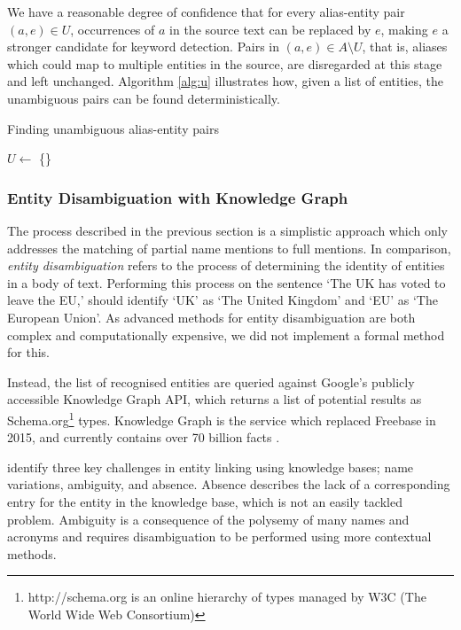 We have a reasonable degree of confidence that for every alias-entity pair $(a, e) \in U$, occurrences of $a$ in the source text can be replaced by $e$, making $e$ a stronger candidate for keyword detection. Pairs in $(a, e) \in A\setminus{U}$, that is, aliases which could map to multiple entities in the source, are disregarded at this stage and left unchanged. Algorithm \ref{alg:u} illustrates how, given a list of entities, the unambiguous pairs can be found deterministically.
\begin{algorithm}
\label{alg:u}
 \caption{Finding unambiguous alias-entity pairs}
 $U \gets$ \{\}\;
\end{algorithm}


\subsubsection{Entity Disambiguation with Knowledge Graph} \label{sec:gkg}

The process described in the previous section is a simplistic approach which only addresses the matching of partial name mentions to full mentions. In comparison, \textit{entity disambiguation} refers to the process of determining the identity of entities in a body of text. Performing this process on the sentence `The UK has voted to leave the EU,' should identify `UK' as `The United Kingdom' and `EU' as `The European Union'. As advanced methods for entity disambiguation are both complex and computationally expensive, we did not implement a formal method for this. 

Instead, the list of recognised entities are queried against Google's publicly accessible Knowledge Graph API, which returns a list of potential results as Schema.org\footnote{http://schema.org is an online hierarchy of types managed by W3C (The World Wide Web Consortium)} types. Knowledge Graph is the service which replaced Freebase in 2015, and currently contains over 70 billion facts \citep{knowledgegraph}.

\cite{EntityDisambiguationForKnowledgeBasePopulation} identify three key challenges in entity linking using knowledge bases; name variations, ambiguity, and absence. Absence describes the lack of a corresponding entry for the entity in the knowledge base, which is not an easily tackled problem. Ambiguity is a consequence of the polysemy of many names and acronyms and requires disambiguation to be performed using more contextual methods. 

